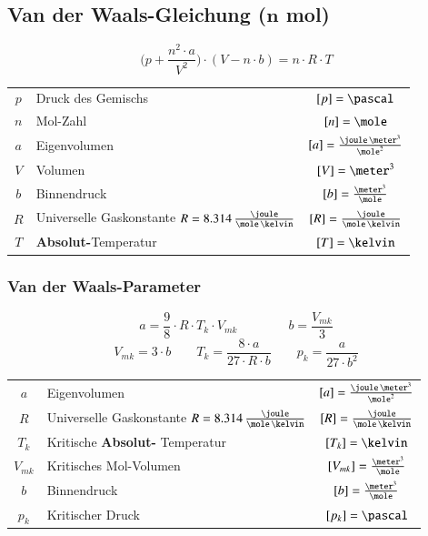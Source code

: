 \subsection[Van der Waals-Gleichung (n Mol)]{Van der Waals-Gleichung ($\bm{n}$ mol)}

\vspace{-0.2cm}

$$ \boxed{ \Big( p + \frac{n^2 \cdot a}{V^2} \Big)  \cdot (V - n \cdot b) = n \cdot R \cdot T } $$

\renewcommand{\arraystretch}{1.3}
\begin{tabular}{c l c}
	$p$ & Druck des Gemischs 															& $[p] = \pascal$ 								\\
	$n$ & Mol-Zahl 																		& $[n] = \mole$ 								\\
	$a$ & Eigenvolumen 																	& $[a] = \frac{\joule \, \meter^3}{\mole^2}$ 	\\
	$V$ & Volumen 																		& $[V] = \meter^3$ 								\\
	$b$ & Binnendruck 																	& $[b] = \frac{\meter^3}{\mole}$ 				\\
	$R$	& Universelle Gaskonstante $R = 8.314 \, \frac{\joule}{\mole \, \kelvin}$ 		& $[R] = \frac{\joule}{\mole \, \kelvin}$ 		\\
	$T$ & \textbf{Absolut-}Temperatur 													& $[T] = \kelvin$
\end{tabular}
\renewcommand{\arraystretch}{1}


\subsubsection{Van der Waals-Parameter}

\vspace{-0.2cm}
$$ \boxed{ a = \frac{9}{8} \cdot R \cdot T_k \cdot V_{mk} }  \qquad \qquad  \boxed{ b = \frac{V_{mk}}{3} }$$
$$ \boxed{ V_{mk} = 3 \cdot b } \quad \quad \boxed{ T_k = \frac{8 \cdot a}{27 \cdot R \cdot b} } \quad \quad  \boxed{ p_k = \frac{a}{27 \cdot b^2} } $$


\renewcommand{\arraystretch}{1.3}
\begin{tabular}{c l c}
	$a$ 		& Eigenvolumen 																	& $[a] = \frac{\joule \, \meter^3}{\mole^2}$ 	\\
	$R$			& Universelle Gaskonstante $R = 8.314 \, \frac{\joule}{\mole \, \kelvin}$ 		& $[R] = \frac{\joule}{\mole \, \kelvin}$ 		\\
	$T_k$ 		& Kritische \textbf{Absolut-} Temperatur 										& $[T_k] = \kelvin$ 							\\
	$V_{mk}$ 	& Kritisches Mol-Volumen 														& $[V_{mk}] = \frac{\meter^3}{\mole}$ 			\\
	$b$ 		& Binnendruck 																	& $[b] = \frac{\meter^3}{\mole}$ 				\\
	$p_k$ 		& Kritischer Druck 																& $[p_k] = \pascal$
\end{tabular}
\renewcommand{\arraystretch}{1}

